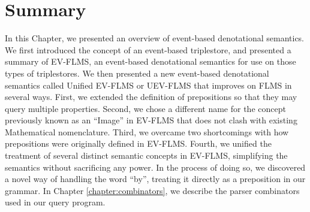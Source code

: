 \documentclass[../main.tex]{subfiles}
\begin{document}
\section{Summary}

In this Chapter, we presented an overview of event-based denotational semantics.  We first introduced the concept of an event-based triplestore,
and presented a summary of EV-FLMS, an event-based denotational semantics for use on those types of triplestores.  We then presented a new
event-based denotational semantics called Unified EV-FLMS or UEV-FLMS that improves on FLMS in several ways.  First, we extended the definition of prepositions
so that they may query multiple properties.  Second, we chose a different name for the concept previously known as an ``Image'' in EV-FLMS that does not clash
with existing Mathematical nomenclature.  Third, we overcame two shortcomings with how prepositions were originally defined in EV-FLMS.  Fourth, we unified
the treatment of several distinct semantic concepts in EV-FLMS, simplifying the semantics without sacrificing any power.  In the process of doing so, we discovered
a novel way of handling the word ``by'', treating it directly as a preposition in our grammar.  In Chapter \ref{chapter:combinators}, we describe the parser
combinators used in our query program.
\end{document}
